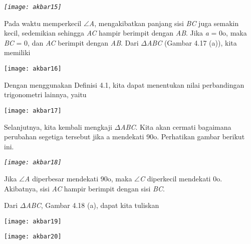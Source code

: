 \documentclass[11pt,fleqn]{book} %
\begin{document}
\begin{myEnumerate}
\begin{itemize}
\noindent \textit{}

\noindent \textit{}

\noindent \textit{}

\noindent \textit{}

\noindent \textit{}

\noindent \textit{\texttt{[image: akbar15]}}

\noindent \textbf{}

\noindent Pada waktu memperkecil $\mathrm{\angle }$\textit{A}, mengakibatkan panjang sisi \textit{BC }juga semakin kecil, sedemikian sehingga \textit{AC }hampir berimpit dengan \textit{AB}. Jika \textit{a }= 0o, maka \textit{BC }= 0, dan \textit{AC }berimpit dengan \textit{AB}. Dari $\Delta$\textit{ABC }(Gambar 4.17 (a)), kita memiliki

\noindent \texttt{[image: akbar16]}

\noindent 

\noindent Dengan menggunakan Definisi 4.1, kita dapat menentukan nilai perbandingan trigonometri lainnya, yaitu

\noindent \texttt{[image: akbar17]}

\noindent 

\noindent 

\noindent Selanjutnya, kita kembali mengkaji $\Delta$\textit{ABC}. Kita akan cermati bagaimana perubahan segetiga tersebut jika a mendekati 90o. Perhatikan gambar berikut ini.

\noindent \textit{\texttt{[image: akbar18]}}

\noindent \textit{}

\noindent Jika $\mathrm{\angle }$\textit{A }diperbesar mendekati 90o, maka $\mathrm{\angle }$\textit{C }diperkecil mendekati 0o. Akibatnya, sisi \textit{AC }hampir berimpit dengan sisi \textit{BC}.

\noindent 

\noindent Dari $\Delta$\textit{ABC}, Gambar 4.18 (a), dapat kita tuliskan

\noindent 

\noindent \texttt{[image: akbar19]}

\noindent 

\noindent \texttt{[image: akbar20]}


\end{itemize}
\end{myEnumerate}
\end{document}
